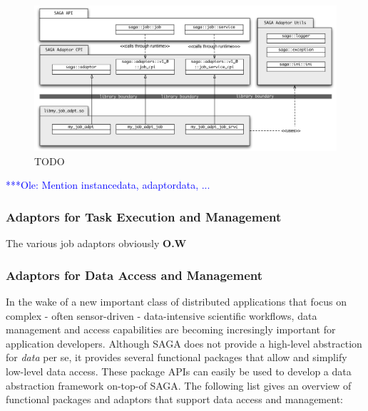 \documentclass[a4paper,10pt]{article}
\newcommand{\onote}[1]{  {\textcolor{blue}     { ***Ole: #1 }}}
\newcommand{\onote}[1]{}
\begin{document}
 \begin{figure}
 \begin{center}
 \includegraphics[scale=0.5]{figures/cpi-detail}
 \end{center}
 \caption{TODO}
\label{fig:cpi-detail}
\end{figure}

 
 \onote{Mention instancedata, adaptordata, ...}
 
 \subsubsection{Adaptors for Task Execution and Management}
 The various job adaptors obviously \textbf{O.W}
 
 \subsubsection{Adaptors for Data Access and Management}
 In the wake of a new important class of distributed applications that focus on 
 complex - often sensor-driven - data-intensive scientific workflows, data 
 management and access capabilities are becoming incresingly important for 
 application developers. Although SAGA does not provide a high-level abstraction
 for \textit{data} per se, it provides several functional packages that allow 
 and simplify low-level data access. These package APIs can easily be used to 
 develop a data abstraction framework on-top-of SAGA. The following list gives an
 overview of functional packages and adaptors that support data access and 
 management:
 
\end{document}
